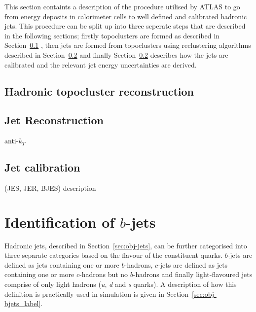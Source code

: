 This section containts a description of the procedure utilised by ATLAS
to go from energy deposits in calorimeter cells to well defined and calibrated hadronic jets.
This procedure can be split up into three seperate steps that are described in the following sections;
firstly topoclusters are formed as described in Section~\ref{sec:obj-jets_topo} ,
then jets are formed from topoclusters using reclustering algorithms described in Section~\ref{sec:obj-jets_reco}
and finally Section~\ref{sec:obj-jets_reco} describes how the jets are calibrated and the relevant jet energy uncertainties are derived.

\subsection{Hadronic topocluster reconstruction}
\label{sec:obj-jets_topo}

\subsection{Jet Reconstruction}
\label{sec:obj-jets_reco}

anti-$k_T$
\subsection{Jet calibration}
(JES, JER, BJES) description

\section{Identification of $b$-jets}
\label{sec:obj-bjets}

Hadronic jets, described in Section~\ref{sec:obj-jets}, can be further categorised into three separate categories based on the flavour of the constituent quarks.
$b$-jets are defined as jets containing one or more $b$-hadrons,
$c$-jets are defined as jets containing one or more $c$-hadrons but no $b$-hadrons
and finally light-flavoured jets comprise of only light hadrons (\textit{u}, \textit{d} and \textit{s} quarks).
A description of how this definition is practically used in simulation is given in Section~\ref{sec:obj-bjets_label}.

